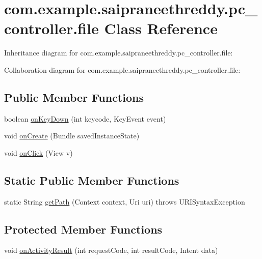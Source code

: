 \hypertarget{classcom_1_1example_1_1saipraneethreddy_1_1pc__controller_1_1file}{}\section{com.\+example.\+saipraneethreddy.\+pc\+\_\+controller.\+file Class Reference}
\label{classcom_1_1example_1_1saipraneethreddy_1_1pc__controller_1_1file}


Inheritance diagram for com.\+example.\+saipraneethreddy.\+pc\+\_\+controller.\+file\+:


Collaboration diagram for com.\+example.\+saipraneethreddy.\+pc\+\_\+controller.\+file\+:
\subsection*{Public Member Functions}
\begin{DoxyCompactItemize}
\item 
boolean \hyperlink{classcom_1_1example_1_1saipraneethreddy_1_1pc__controller_1_1file_a3b053bbc57000ae9058ed6e086599542}{on\+Key\+Down} (int keycode, Key\+Event event)
\item 
void \hyperlink{classcom_1_1example_1_1saipraneethreddy_1_1pc__controller_1_1file_abba61524d70ff07c5004ec6dec1136b6}{on\+Create} (Bundle saved\+Instance\+State)
\item 
void \hyperlink{classcom_1_1example_1_1saipraneethreddy_1_1pc__controller_1_1file_a45c12ab5c7c36c0e28a7605e39e30ff9}{on\+Click} (View v)
\end{DoxyCompactItemize}
\subsection*{Static Public Member Functions}
\begin{DoxyCompactItemize}
\item 
static String \hyperlink{classcom_1_1example_1_1saipraneethreddy_1_1pc__controller_1_1file_a792d4cbfb576295f5c896b2a036951de}{get\+Path} (Context context, Uri uri)  throws U\+R\+I\+Syntax\+Exception 
\end{DoxyCompactItemize}
\subsection*{Protected Member Functions}
\begin{DoxyCompactItemize}
\item 
void \hyperlink{classcom_1_1example_1_1saipraneethreddy_1_1pc__controller_1_1file_a5cfdfe94f23875cc92a12ec03aa16b3d}{on\+Activity\+Result} (int request\+Code, int result\+Code, Intent data)
\end{DoxyCompactItemize}
